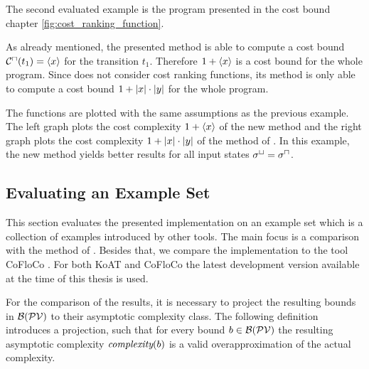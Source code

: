 The second evaluated example is the program presented in the cost bound chapter \ref{fig:cost_ranking_function}.



As already mentioned, the presented method is able to compute a cost bound ${\mathcal{C}^\sqcap}(t_1) = \langle x\rangle$ for the transition $t_1$.
Therefore $1 + \langle x\rangle$ is a cost bound for the whole program.
Since \cite{koat} does not consider cost ranking functions, its method is only able to compute a cost bound $1 + \left|x\right| \cdot \left|y\right|$ for the whole program.

The functions are plotted with the same assumptions as the previous example.
The left graph plots the cost complexity $1 + \langle x\rangle$ of the new method and the right graph plots the cost complexity $1 + \left|x\right| \cdot \left|y\right|$ of the method of \cite{koat}.
In this example, the new method yields better results for all input states ${\sigma^\sqcup} = {\sigma^\sqcap}$.

\subsection{Evaluating an Example Set}

This section evaluates the presented implementation on an example set which is a collection of examples introduced by other tools.
The main focus is a comparison with the method of \cite{koat}.
Besides that, we compare the implementation to the tool CoFloCo \cite{cofloco3}.
For both KoAT and CoFloCo the latest development version available at the time of this thesis is used.

For the comparison of the results, it is necessary to project the resulting bounds in $\mathcal{B}(\mathcal{PV})$ to their asymptotic complexity class.
The following definition introduces a projection, such that for every bound $b \in \mathcal{B}(\mathcal{PV})$ the resulting asymptotic complexity $\emph{complexity}(b)$ is a valid overapproximation of the actual complexity.

